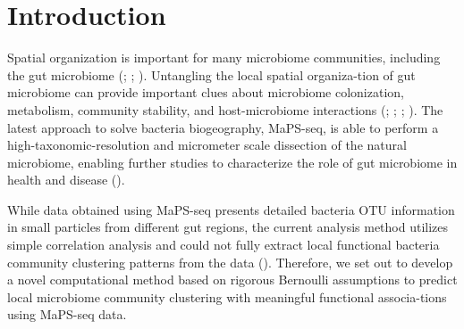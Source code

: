 \documentclass{bioinfo}
\begin{document}
\maketitle

\section{Introduction}

Spatial organization is important for many microbiome communities, including the gut microbiome (\citealp{Cordero2016}; \citealp{Swidsinski2008}; \citealp{Donaldson2016}). Untangling the local spatial organiza-tion of gut microbiome can provide important clues about microbiome colonization, metabolism, community stability, and host-microbiome interactions (\citealp{Lee2013}; \citealp{Nagara2017}; \citealp{Coyte2015}; \citealp{Wexler2016}). The latest approach to solve bacteria biogeography, MaPS-seq, is able to perform a high-taxonomic-resolution and micrometer scale dissection of the natural microbiome, enabling further studies to characterize the role of gut microbiome in health and disease (\citealp{Sheth2019}). 

While data obtained using MaPS-seq presents detailed bacteria OTU information in small particles from different gut regions, the current analysis method utilizes simple correlation analysis and could not fully extract local functional bacteria community clustering patterns from the data (\citealp{Sheth2019}). Therefore, we set out to develop a novel computational method based on rigorous Bernoulli assumptions to predict local microbiome community clustering with meaningful functional associa-tions using MaPS-seq data. 
\end{document}
